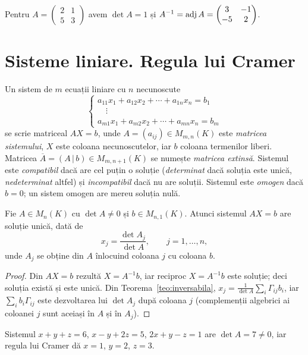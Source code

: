 \begin{exemplu}
Pentru $A=\begin{pmatrix}2&1\\5&3\end{pmatrix}$ avem $\det A=1$ și $A^{-1}=\operatorname{adj} A=\begin{pmatrix}3&-1\\-5&2\end{pmatrix}$.
\end{exemplu}

\section{Sisteme liniare. Regula lui Cramer}

Un sistem de $m$ ecuații liniare cu $n$ necunoscute
\[
\begin{cases}
a_{11}x_1+a_{12}x_2+\cdots+a_{1n}x_n=b_1\\
\quad\vdots\\
a_{m1}x_1+a_{m2}x_2+\cdots+a_{mn}x_n=b_m
\end{cases}
\]
se scrie matriceal $AX=b$, unde $A=(a_{ij})\in M_{m,n}(K)$ este \emph{matricea sistemului}, $X$ este coloana necunoscutelor, iar $b$ coloana termenilor liberi. Matricea $\overline{A}=(A\,|\,b)\in M_{m,n+1}(K)$ se numește \emph{matricea extinsă}. Sistemul este \emph{compatibil} dacă are cel puțin o soluție (\emph{determinat} dacă soluția este unică, \emph{nedeterminat} altfel) și \emph{incompatibil} dacă nu are soluții. Sistemul este \emph{omogen} dacă $b=0$; un sistem omogen are mereu soluția nulă.

\begin{teorema}\label{teo:cramer}
Fie $A\in M_n(K)$ cu $\det A\neq0$ și $b\in M_{n,1}(K)$. Atunci sistemul $AX=b$ are soluție unică, dată de
\[
x_j=\frac{\det A_j}{\det A},\qquad j=1,\dots,n,
\]
unde $A_j$ se obține din $A$ înlocuind coloana $j$ cu coloana $b$.
\end{teorema}

\begin{proof}
Din $AX=b$ rezultă $X=A^{-1}b$, iar reciproc $X=A^{-1}b$ este soluție; deci soluția există și este unică. Din Teorema~\ref{teo:inversabila}, $x_j=\frac1{\det A}\sum_i\Gamma_{ij}b_i$, iar $\sum_i b_i\Gamma_{ij}$ este dezvoltarea lui $\det A_j$ după coloana $j$ (complemenții algebrici ai coloanei $j$ sunt aceiași în $A$ și în $A_j$).
\end{proof}

\begin{exemplu}
Sistemul $x+y+z=6$, $x-y+2z=5$, $2x+y-z=1$ are $\det A=7\neq 0$, iar regula lui Cramer dă $x=1$, $y=2$, $z=3$.
\end{exemplu}

